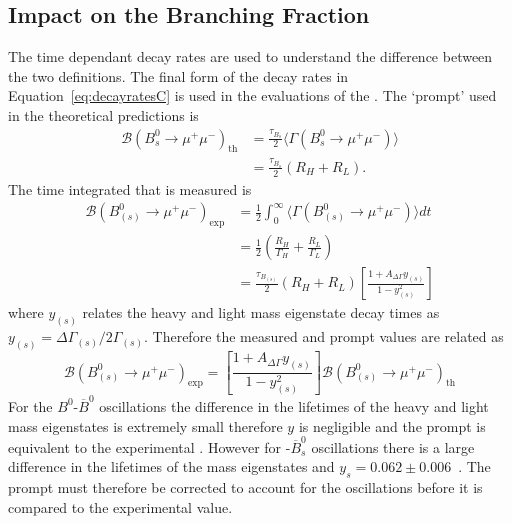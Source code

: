 \subsection{Impact on the Branching Fraction}
\label{sec:BFimpact}
The time dependant decay rates are used to understand the difference between the two \BF definitions. The final form of the decay rates in Equation~\ref{eq:decayratesC} is used in the evaluations of the \BFs. The `prompt' \BF used in the theoretical predictions is
\begin{align}
\mathcal{B}(B^{0}_{s} \to \mu^{+} \mu^{-})_{\mathrm{th}} &= \frac{\tau_{B_{s}}}{2} \langle \Gamma(B^{0}_{s} \to \mu^{+} \mu^{-}) \rangle \\
&=\frac{\tau_{B_{s}}}{2} (R_{H} + R_{L}).
\end{align}
The time integrated \BF that is measured is
\begin{align}
  \mathcal{B}(B^{0}_{(s)} \to \mu^{+}\mu^{-})_{\mathrm{exp}} &= \frac{1}{2} \int^{\infty}_0 \langle \Gamma (B^{0}_{(s)} \to \mu^{+}\mu^{-}) \rangle  dt \nonumber \\
&= \frac{1}{2} \left( \frac{R_{H}}{\Gamma_{H}} + \frac{R_{L}}{\Gamma_{L}} \right) \nonumber \\
&= \frac{\tau_{B_{(s)}}}{2}(R_{H} + R_{L}) \left[ \frac{1 + A_{\Delta\Gamma}y_{(s)}}{1 - y_{(s)}^{2}} \right]
\end{align}
where $y_{(s)}$ relates the heavy and light mass eigenstate decay times as $y_{(s)} = \Delta \Gamma_{(s)} / 2\Gamma_{(s)}$. Therefore the measured and prompt \BF values are related as
\begin{equation}
  \mathcal{B}(B^0_{(s)} \to \mu^+\mu^-)_{\mathrm{exp}} = \left[ \frac{1 + A_{\Delta\Gamma}y_{(s)}}{1 - y_{(s)}^{2}} \right] \mathcal{B}(B^0_{(s)} \to \mu^+ \mu^-)_{\mathrm{th}}
\end{equation}
For the $B^0$-$\overline{B}^0$ oscillations the difference in the lifetimes of the heavy and light mass eigenstates is extremely small therefore $y$ is negligible and the prompt \BF is equivalent to the experimental \BF. However for \bs-$\overline{B}^0_s$ oscillations there is a large difference in the lifetimes of the mass eigenstates and $y_s =0.062 \pm 0.006$~\cite{Amhis:2016xyh}. The prompt \BF must therefore be corrected to account for the oscillations before it is compared to the experimental value.
